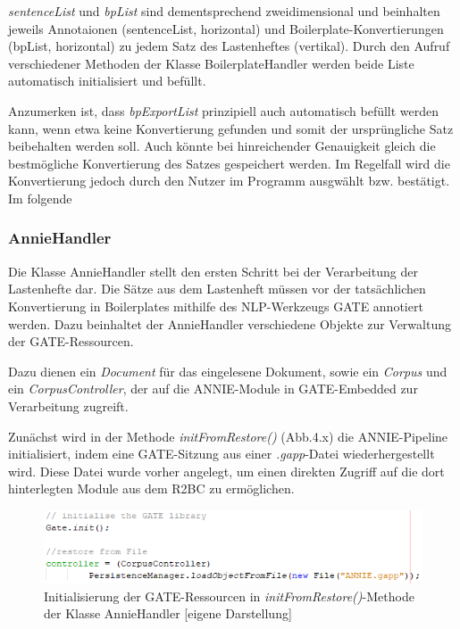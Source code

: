 \documentclass[12pt]{report}
\begin{document}
\textit{sentenceList} und \textit{bpList} sind dementsprechend zweidimensional und beinhalten jeweils Annotaionen (sentenceList, horizontal) und Boilerplate-Konvertierungen (bpList, horizontal) zu jedem Satz des Lastenheftes (vertikal). 
Durch den Aufruf verschiedener Methoden der Klasse BoilerplateHandler werden beide Liste automatisch initialisiert und befüllt.

Anzumerken ist, dass \textit{bpExportList} prinzipiell auch automatisch befüllt werden kann, wenn etwa keine Konvertierung gefunden und somit der ursprüngliche Satz beibehalten werden soll. Auch könnte bei hinreichender Genauigkeit gleich die bestmögliche Konvertierung des Satzes gespeichert werden. Im Regelfall wird die Konvertierung jedoch durch den Nutzer im Programm ausgwählt bzw. bestätigt. 
Im folgende

\subsubsection{AnnieHandler}
Die Klasse AnnieHandler stellt den ersten Schritt bei der Verarbeitung der Lastenhefte dar. Die Sätze aus dem Lastenheft müssen vor der tatsächlichen Konvertierung in Boilerplates mithilfe des NLP-Werkzeugs GATE annotiert werden.
Dazu beinhaltet der AnnieHandler verschiedene Objekte zur Verwaltung der GATE-Ressourcen. 

Dazu dienen ein \textit{Document} für das eingelesene Dokument, sowie ein \textit{Corpus} und ein \textit{CorpusController}, der auf die ANNIE-Module in GATE-Embedded zur Verarbeitung zugreift.

Zunächst wird in der Methode \textit{initFromRestore()} (Abb.4.x) die ANNIE-Pipeline initialisiert, indem eine GATE-Sitzung aus einer \textit{.gapp}-Datei wiederhergestellt wird. Diese Datei wurde vorher angelegt, um einen direkten Zugriff auf die dort hinterlegten Module aus dem R2BC zu ermöglichen.

\begin{figure}[h!]
\begin{center}
\includegraphics[scale=1]{Bilder/AnnieHandler-initFromRestore.png}
\caption{Initialisierung der GATE-Ressourcen in \textit{initFromRestore()}-Methode der Klasse AnnieHandler [eigene Darstellung]}
\end{center}
\end{figure}
\end{document}
